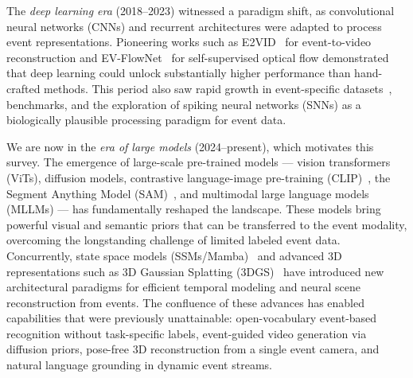 The \textit{deep learning era} (2018--2023) witnessed a paradigm shift, as convolutional neural networks (CNNs) and recurrent architectures were adapted to process event representations. Pioneering works such as E2VID~\cite{rebecq2019e2vid} for event-to-video reconstruction and EV-FlowNet~\cite{zhu2018evflownet} for self-supervised optical flow demonstrated that deep learning could unlock substantially higher performance than hand-crafted methods. This period also saw rapid growth in event-specific datasets~\cite{gehrig2021dsec,perot2020red}, benchmarks, and the exploration of spiking neural networks (SNNs) as a biologically plausible processing paradigm for event data.

We are now in the \textit{era of large models} (2024--present), which motivates this survey. The emergence of large-scale pre-trained models --- vision transformers (ViTs), diffusion models, contrastive language-image pre-training (CLIP)~\cite{radford2021clip}, the Segment Anything Model (SAM)~\cite{kirillov2023sam}, and multimodal large language models (MLLMs) --- has fundamentally reshaped the landscape. These models bring powerful visual and semantic priors that can be transferred to the event modality, overcoming the longstanding challenge of limited labeled event data. Concurrently, state space models (SSMs/Mamba)~\cite{gu2023mamba} and advanced 3D representations such as 3D Gaussian Splatting (3DGS)~\cite{kerbl20233dgs} have introduced new architectural paradigms for efficient temporal modeling and neural scene reconstruction from events. The confluence of these advances has enabled capabilities that were previously unattainable: open-vocabulary event-based recognition without task-specific labels, event-guided video generation via diffusion priors, pose-free 3D reconstruction from a single event camera, and natural language grounding in dynamic event streams.

